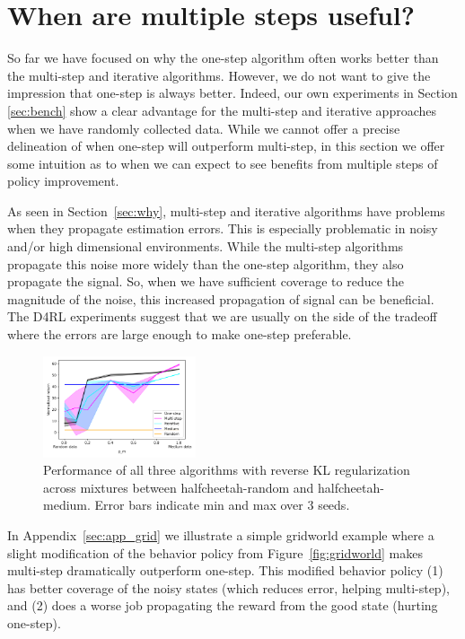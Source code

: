\section{When are multiple steps useful?}\label{sec:when}

So far we have focused on why the one-step algorithm often works better than the multi-step and iterative algorithms. However, we do not want to give the impression that one-step is always better. Indeed, our own experiments in Section \ref{sec:bench} show a clear advantage for the multi-step and iterative approaches when we have randomly collected data. While we cannot offer a precise delineation of when one-step will outperform multi-step, in this section we offer some intuition as to when we can expect to see benefits from multiple steps of policy improvement.

As seen in Section~\ref{sec:why}, multi-step and iterative algorithms have problems when they propagate estimation errors. This is especially problematic in noisy and/or high dimensional environments. While the multi-step algorithms propagate this noise more widely than the one-step algorithm, they also propagate the signal. So, when we have sufficient coverage to reduce the magnitude of the noise, this increased propagation of signal can be beneficial. The D4RL experiments suggest that we are usually on the side of the tradeoff where the errors are large enough to make one-step preferable.


\begin{figure}[h]
\vspace{-0.3cm}
    \centering
    \includegraphics[width=0.4\textwidth]{figures/offline-rl/learning curves/r-m_mixture.png}
    \caption{Performance of all three algorithms with reverse KL regularization across mixtures between halfcheetah-random and halfcheetah-medium. Error bars indicate min and max over 3 seeds.}
    \label{fig:interp}
\end{figure}

In Appendix~\ref{sec:app_grid} we illustrate a simple gridworld example where a slight modification of the behavior policy from Figure~\ref{fig:gridworld} makes multi-step dramatically outperform one-step. This modified behavior policy (1) has better coverage of the noisy states (which reduces error, helping multi-step), and (2) does a worse job propagating the reward from the good state (hurting one-step).

